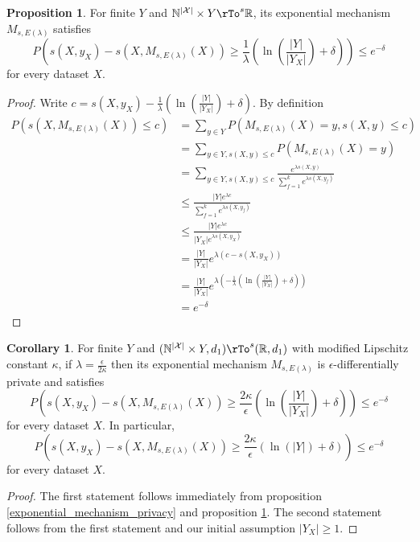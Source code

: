 \documentclass[12pt]{amsart}
\theoremstyle{definition}
\newtheorem{corollary}[theorem]{Corollary}
\newtheorem{proposition}[theorem]{Proposition}
\begin{document}
\begin{proposition} \label{exponential_mechanism_accuracy} For finite $Y$ and $\mathbb{N}^{|\mathcal{X}|} \times Y \rTo^s \mathbb{R}$, its exponential mechanism $M_{s, E(\lambda)}$ satisfies
$$P \left( s(X, y_X) - s(X, M_{s, E(\lambda)}(X)) \geq \frac{1}{\lambda} \left( \ln \left( \frac{|Y|}{|Y_X|} \right) + \delta \right) \right) \leq e^{-\delta}$$
for every dataset $X$.
\end{proposition}
\begin{proof} Write $c = s(X, y_X) - \frac{1}{\lambda} \left( \ln \left( \frac{|Y|}{|Y_X|} \right) + \delta \right)$. By definition
\begin{align*}
P(s(X, M_{s, E(\lambda)}(X)) \leq c) & = \sum\limits_{y \in Y} P(M_{s, E(\lambda)}(X) = y, s(X, y) \leq c) \\
 & = \sum\limits_{y \in Y, s(X, y) \leq c} P(M_{s, E(\lambda)}(X) = y) \\
 & = \sum\limits_{y \in Y, s(X, y) \leq c} \frac{e^{\lambda s(X, y)}}{\sum\limits_{f = 1}^k e^{\lambda s(X, y_f)}} \\
 & \leq \frac{|Y| e^{\lambda c}}{\sum\limits_{f = 1}^k e^{\lambda s(X, y_f)}} \\
 & \leq \frac{|Y| e^{\lambda c}}{|Y_X| e^{\lambda s(X, y_X)}} \\
 & = \frac{|Y|}{|Y_X|} e^{\lambda (c - s(X, y_X))} \\
 & = \frac{|Y|}{|Y_X|} e^{\lambda (- \frac{1}{\lambda} (\ln \left( \frac{|Y|}{|Y_X|} \right) + \delta))} \\
 & = e^{-\delta}
\end{align*}
\end{proof}

\begin{corollary} \label{exponential_mechanism_accuracy_one_case} For finite $Y$ and $(\mathbb{N}^{|\mathcal{X}|} \times Y, d_1) \rTo^s (\mathbb{R}, d_1)$ with modified Lipschitz constant $\kappa$, if $\lambda = \frac{\epsilon}{2 \kappa}$ then its exponential mechanism $M_{s, E(\lambda)}$ is $\epsilon$-differentially private and satisfies
$$P \left( s(X, y_X) - s(X, M_{s, E(\lambda)}(X)) \geq \frac{2 \kappa}{\epsilon} \left( \ln \left( \frac{|Y|}{|Y_X|} \right) + \delta \right) \right) \leq e^{-\delta}$$
for every dataset $X$. In particular,
$$P \left( s(X, y_X) - s(X, M_{s, E(\lambda)}(X)) \geq \frac{2 \kappa}{\epsilon} \left( \ln(|Y|) + \delta \right) \right) \leq e^{-\delta}$$
for every dataset $X$.
\end{corollary}
\begin{proof} The first statement follows immediately from proposition \ref{exponential_mechanism_privacy} and proposition \ref{exponential_mechanism_accuracy}. The second statement follows from the first statement and our initial assumption $|Y_X| \geq 1$.
\end{proof}
\end{document}
